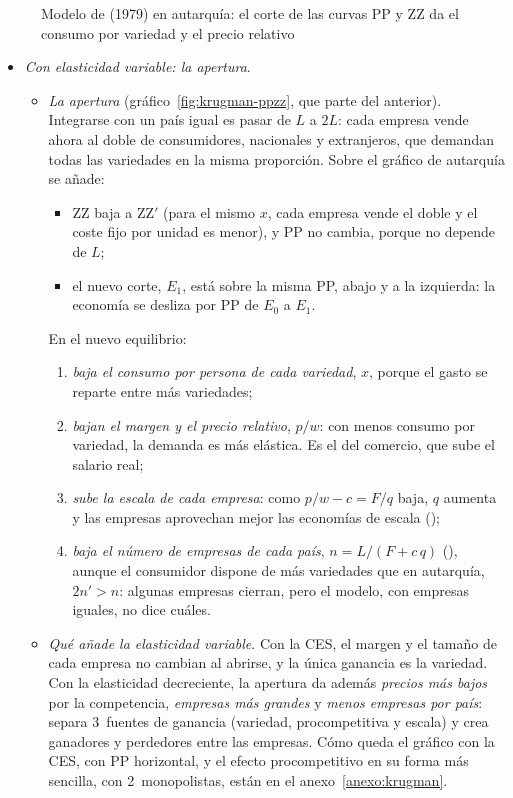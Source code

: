 \documentclass[11pt]{article}
\begin{document}
\begin{figure}[H]
\centering
\caption{Modelo de  (1979) en autarquía: el corte de las curvas PP y ZZ da el consumo por variedad y el precio relativo}\label{fig:krugman-ppzz-autarquia}
\end{figure}

\begin{itemize}
\item \emph{Con elasticidad variable: la apertura}.
  \begin{itemize}
  \item \emph{La apertura} (gráfico~\ref{fig:krugman-ppzz}, que parte del anterior). Integrarse con un país igual es pasar de $L$ a $2L$: cada empresa vende ahora al doble de consumidores, nacionales y extranjeros, que demandan todas las variedades en la misma proporción. Sobre el gráfico de autarquía se añade:
    \begin{itemize}
    \item ZZ baja a ZZ$'$ (para el mismo $x$, cada empresa vende el doble y el coste fijo por unidad es menor), y PP no cambia, porque no depende de $L$;
    \item el nuevo corte, $E_1$, está sobre la misma PP, abajo y a la izquierda: la economía se desliza por PP de $E_0$ a $E_1$.
    \end{itemize}
    En el nuevo equilibrio:
    \begin{enumerate}
    \item \emph{baja el consumo por persona de cada variedad}, $x$, porque el gasto se reparte entre más variedades;
    \item \emph{bajan el margen y el precio relativo}, $p/w$: con menos consumo por variedad, la demanda es más elástica. Es el  del comercio, que sube el salario real;
    \item \emph{sube la escala de cada empresa}: como $p/w-c=F/q$ baja, $q$ aumenta y las empresas aprovechan mejor las economías de escala ();
    \item \emph{baja el número de empresas de cada país}, $n=L/(F+c\,q)$ (), aunque el consumidor dispone de más variedades que en autarquía, $2n'>n$: algunas empresas cierran, pero el modelo, con empresas iguales, no dice cuáles.
    \end{enumerate}
  \item \emph{Qué añade la elasticidad variable}. Con la CES, el margen y el tamaño de cada empresa no cambian al abrirse, y la única ganancia es la variedad. Con la elasticidad decreciente, la apertura da además \emph{precios más bajos} por la competencia, \emph{empresas más grandes} y \emph{menos empresas por país}: separa 3~fuentes de ganancia (variedad, procompetitiva y escala) y crea ganadores y perdedores entre las empresas. Cómo queda el gráfico con la CES, con PP horizontal, y el efecto procompetitivo en su forma más sencilla, con 2~monopolistas, están en el anexo~\ref{anexo:krugman}.
  \end{itemize}
\end{itemize}
\end{document}
